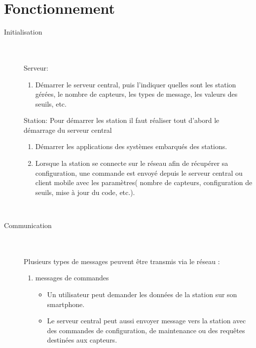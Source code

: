 \documentclass [a4paper] {report}
\begin{document}
\section{Fonctionnement}

\begin{description}

\item[Initialisation]\hfill\\
	\\Serveur:
	\begin{enumerate}
	\item Démarrer le serveur central, puis l'indiquer quelles sont les station gérées, le nombre de capteurs, les types de message, les valeurs des seuils, etc.\\
	\end{enumerate}
	Station: 
	Pour démarrer les station il faut réaliser tout d'abord le démarrage du serveur central
	\begin{enumerate}
	\item Démarrer les applications des systèmes embarqués des stations.
	\item Lorsque la station se connecte sur le réseau afin de récupérer sa configuration, une commande est envoyé depuis le serveur central ou client mobile avec les paramètres( nombre de capteurs, configuration de seuils, mise à jour du code, etc.).
	\end{enumerate}
\hfill\\
\item [Communication]\hfill\\
	\\Plusieurs types de messages peuvent être transmis via le réseau :\\
	\begin{enumerate}
	\item messages de commandes \\
		\begin{itemize}
		\item Un utilisateur peut demander les données de la station sur son smartphone.\\
		\item Le serveur central peut aussi envoyer message vers la station avec des commandes de configuration, de maintenance ou des requêtes destinées aux capteurs.\\
		\end{itemize}
	

\end{enumerate}
\end{description}
\end{document}

